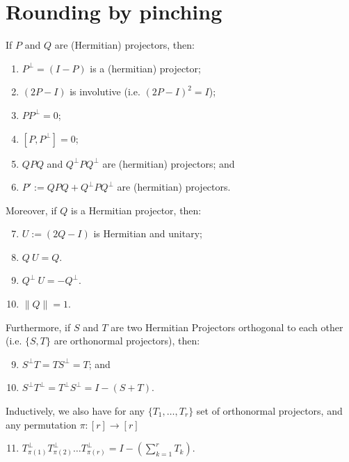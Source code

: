 \section{Rounding by pinching}


\begin{fact}\label{I-minus-P}
    If $P$ and $Q$ are (Hermitian) projectors, then:
    \begin{enumerate}
        \item $P^\bot = (I - P)$ is a (hermitian) projector;
        \item $\left(2P - I\right)$ is involutive (i.e. $\left(2P - I\right)^2 = I$);
        \item $P P^\bot = 0$;
        \item $[P, P^\bot] = 0$;
        \item $QPQ$ and $Q^\bot P Q^\bot$ are (hermitian) projectors; and
        \item $P' := QPQ + Q^\bot P Q^\bot$ are (hermitian) projectors.
    \end{enumerate}
Moreover, if $Q$ is a Hermitian projector, then:
\begin{enumerate}
\setcounter{enumi}{6}
    \item $U := (2Q - I)$ is Hermitian and unitary;
    \item $Q\ U = Q$.
    \item $Q^\bot\ U = -Q^\bot$.
    \item $\| Q\| = 1$.
\end{enumerate}
Furthermore, if $S$ and $T$ are two Hermitian Projectors orthogonal to each other (i.e. $\{S, T\}$ are orthonormal projectors), then:
\begin{enumerate}
\setcounter{enumi}{8}
    \item $S^\bot T = T S^\bot = T$; and
    \item $S^\bot T^\bot = T^\bot S^\bot = I - (S + T)$.
\end{enumerate}
Inductively, we also have for any $\{T_1, \dots, T_r\}$ set of orthonormal projectors, and any permutation $\pi: [r] \to [r]$
\begin{enumerate}
\setcounter{enumi}{10}
    \item $T_{\pi(1)}^\bot T_{\pi(2)}^\bot\dots T_{\pi(r)}^\bot = I - (\sum\limits_{k = 1}^r T_k)$.
\end{enumerate}


\end{fact}
